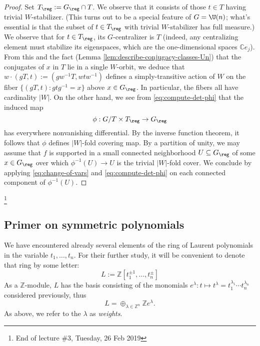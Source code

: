 \documentclass[reqno]{amsart} 
\begin{document}
\begin{proof}
  Set $T_{\reg} := G_{\reg} \cap T$.  We observe that it consists of those $t \in T$ having trivial $W$-stabilizer.  (This turns out to be a special feature of $G = \U(n)$; what's essential is that the subset of $t \in T_{\reg}$ with trivial $W$-stabilizer has full measure.)  We observe that for $t \in T_{\reg}$, its $G$-centralizer is $T$ (indeed, any centralizing element must stabilize its eigenspaces, which are the one-dimensional spaces $\mathbb{C} e_j$).  From this and the fact (Lemma \ref{lem:describe-conjugacy-classes-Un}) that the conjugates of $x$ in $T$ lie in a single $W$-orbit, we deduce that $w \cdot (g T, t) := (g w^{-1} T, w t w^{-1})$ defines a simply-transitive action of $W$ on the fiber $\{(g T, t) : g t g^{-1} = x\}$ above $x \in G_{\reg}$.  In particular, the fibers all have cardinality $|W|$.  On the other hand, we see from \eqref{eq:compute-det-phi} that the induced map
  \begin{equation*}
    \phi : G/T \times T_{\reg} \rightarrow G_{\reg}
  \end{equation*}
  has everywhere nonvanishing differential.  By the inverse function theorem, it follows that $\phi$ defines $|W|$-fold covering map.  By a partition of unity, we may assume that $f$ is supported in a small connected neighborhood $U \subseteq G_{\reg}$ of some $x \in G_{\reg}$ over which $\phi^{-1}(U) \rightarrow U$ is the trivial $|W|$-fold cover.  We conclude by applying \eqref{eq:change-of-vars} and \eqref{eq:compute-det-phi} on each connected component of $\phi^{-1}(U)$.
\end{proof}
\footnote{End of lecture \#3, Tuesday, 26 Feb 2019}

\subsection{Primer on symmetric polynomials}\label{sec:cnh2voakqk}
We have encountered already several elements of the ring of Laurent polynomials in the variable $t_1,\dotsc,t_n$.  For their further study, it will be convenient to denote that ring by some letter:
\begin{equation*}
  L := \mathbb{Z}[t_1^{\pm 1},\dotsc,t_n^{\pm}]
\end{equation*}
As a $\mathbb{Z}$-module, $L$ has the basis consisting of the monomials $e^\lambda : t \mapsto t^{\lambda} = t_1^{\lambda_1} \dotsb t_n^{\lambda_n}$ considered previously, thus
\begin{equation*}
  L = \oplus_{\lambda \in \mathbb{Z}^n} \mathbb{Z} e^\lambda.
\end{equation*}
As above, we refer to the $\lambda$ as \emph{weights}.
\end{document}
